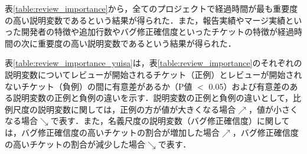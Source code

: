 \documentclass[11pt]{jreport}
\begin{document}
表\ref{table:review_importance}から，全てのプロジェクトで経過時間が最も重要度の高い説明変数であるという結果が得られた．また，報告実績やマージ実績といった開発者の特徴や追加行数やバグ修正確信度といったチケットの特徴が経過時間の次に重要度の高い説明変数であるという結果が得られた．

\begin{table}[t]
\caption{レビューが開始されるチケットの予測において重要度の高い説明変数と重要度}
\label{table:review_importance}
\centering
\vspace{0.5zh}
\end{table}

表\ref{table:review_importance_yuisa}は，表\ref{table:review_importance}のそれぞれの説明変数についてレビューが開始されるチケット（正例）とレビューが開始されないチケット（負例）の間に有意差があるか（P値 $<$ 0.05）および有意差のある説明変数の正例と負例の違いを示す．説明変数の正例と負例の違いとして，比例尺度の説明変数に関しては，正例の方が値が大きくなる場合$\nearrow$，値が小さくなる場合$\searrow$で表す．また，名義尺度の説明変数（バグ修正確信度）に関しては，バグ修正確信度の高いチケットの割合が増加した場合$\nearrow$，バグ修正確信度の高いチケットの割合が減少した場合$\searrow$で表す．
\end{document}
